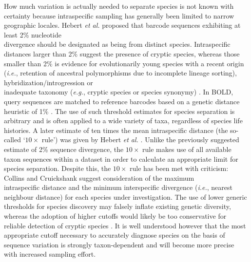 How much variation is actually needed to separate species is not known with certainty because intraspecific sampling has generally been limited to narrow geographic locales. Hebert \textit{et al.} \cite{hebert2003biological} proposed that barcode sequences exhibiting at least 2\% nucleotide \\ divergence should be designated as being from distinct species. Intraspecific distances larger than 2\% suggest the presence of cryptic species, whereas those smaller than 2\% is evidence for evolutionarily young species with a recent origin (\textit{i.e.}, retention of ancestral polymorphisms due to incomplete lineage sorting), hybridization/introgression or \\ inadequate taxonomy (\textit{e.g.}, cryptic species or species synonymy) \cite{hubert2015dna}. In BOLD, query sequences are matched to reference barcodes based on a genetic distance heuristic of 1\% \cite{ratnasingham2007bold}. The use of such threshold estimates for species separation is arbitrary and is often applied to a wide variety of taxa, regardless of species life histories. A later estimate of ten times the mean intraspecific distance (the so-called `$10\times$ rule') was given by Hebert \textit{et al.} \cite{hebert2004identification}. Unlike the previously suggested estimate of 2\% sequence divergence, the $10\times$ rule makes use of all available taxon sequences within a dataset in order to calculate an appropriate limit for species separation. Despite this, the $10\times$ rule has been met with criticism: Collins and Cruickshank \cite{collins2013seven} suggest consideration of the maximum \\ intraspecific distance and the minimum interspecific divergence (\textit{i.e.}, nearest neighbour distance) for each species under investigation. The use of lower generic thresholds for species discovery may falsely inflate existing genetic diversity, whereas the adoption of higher cutoffs would likely be too conservative for reliable detection of cryptic species \cite{april2011genetic}. It is well understood however that the most appropriate cutoff necessary to accurately diagnose species on the basis of sequence variation is strongly taxon-dependent \cite{hebert2003barcoding, hickerson2006dna, meyer2005dna} and will become more precise with increased sampling effort.

\vspace{5mm}

